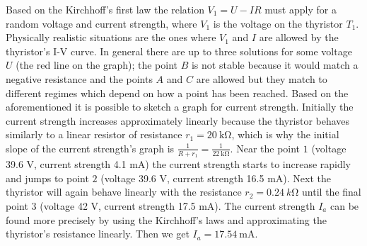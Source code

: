 \documentclass[11pt]{article}
\begin{document}
Based on the Kirchhoff’s first law the relation $V_1 = U - IR$ must apply for a random voltage and current strength, where $V_1$ is the voltage on the thyristor $T_1$. Physically realistic situations are the ones where $V_1$ and $I$ are allowed by the thyristor’s I-V curve. In general there are up to three solutions for some voltage $U$ (the red line on the graph); the point $B$ is not stable because it would match a negative resistance and the points $A$ and $C$ are allowed but they match to different regimes which depend on how a point has been reached. Based on the aforementioned it is possible to sketch a graph for current strength. Initially the current strength increases approximately linearly because the thyristor behaves similarly to a linear resistor of resistance $r_1=\SI{20}{\kilo\ohm}$, which is why the initial slope of the current strength’s graph is $\frac{1}{R + r_1}=\frac{1}{\SI{22}{\kilo\ohm}}$. Near the point $1$ (voltage 39.6 V, current strength 4.1 mA) the current strength starts to increase rapidly and jumps to point $2$ (voltage 39.6 V, current strength 16.5 mA). Next the thyristor will again behave linearly with the resistance $r_2=\SI{0.24}{k\ohm}$ until the final point $3$ (voltage 42 V, current strength 17.5 mA). The current strength $I_a$ can be found more precisely by using the Kirchhoff’s laws and approximating the thyristor’s resistance linearly. Then we get $I_a = \SI{17.54}{\milli\ampere}$.

\begin{figure}[h]
\begin{center}
\end{center}
\end{figure}
\end{document}
